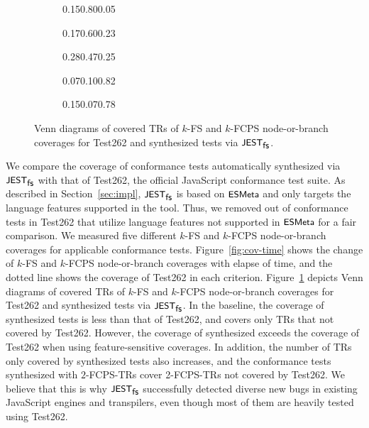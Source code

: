 \begin{figure}
  \centering
  \begin{subfigure}{0.19\textwidth}
    {0.15}{0.80}{0.05}
  \end{subfigure}
  \begin{subfigure}{0.19\textwidth}
    {0.17}{0.60}{0.23}
  \end{subfigure}
  \begin{subfigure}{0.19\textwidth}
    {0.28}{0.47}{0.25}
  \end{subfigure}
  \begin{subfigure}{0.19\textwidth}
    {0.07}{0.10}{0.82}
  \end{subfigure}
  \begin{subfigure}{0.19\textwidth}
    {0.15}{0.07}{0.78}
  \end{subfigure}
  \caption{
    Venn diagrams of covered TRs of $k$-FS and $k$-FCPS node-or-branch coverages
    for Test262 and synthesized tests via $\textsf{\small JEST}_{\textsf{\small fs}}$.
  }
  \label{fig:venn-test262}
\end{figure}



We compare the coverage of conformance tests automatically synthesized via
$\textsf{\small JEST}_{\textsf{\small fs}}$ with that of Test262, the official JavaScript conformance test suite.
%
As described in Section~\ref{sec:impl}, $\textsf{\small JEST}_{\textsf{\small fs}}$ is based on $\textsf{\small ESMeta}$ and only
targets the language features supported in the tool.
%
Thus, we removed  out of  conformance tests in
Test262 that utilize language features not supported in $\textsf{\small ESMeta}$ for a fair
comparison.
%
We measured five different $k$-FS and $k$-FCPS node-or-branch coverages for
 applicable conformance tests.
%
Figure~\ref{fig:cov-time} shows the change of $k$-FS and $k$-FCPS node-or-branch
coverages with elapse of time, and the dotted line shows the coverage of Test262
in each criterion.
%
Figure~\ref{fig:venn-test262} depicts Venn diagrams of covered TRs of $k$-FS and
$k$-FCPS node-or-branch coverages for Test262 and synthesized tests via $\textsf{\small JEST}_{\textsf{\small fs}}$.
%
In the baseline, the coverage of synthesized tests is less than that of Test262,
and covers only  TRs that not covered by Test262.
%
However, the coverage of synthesized exceeds the coverage of Test262 when using
feature-sensitive coverages.
%
In addition, the number of TRs only covered by synthesized tests also increases,
and the conformance tests synthesized with $2$-FCPS-TRs cover 
2-FCPS-TRs not covered by Test262.
%
We believe that this is why $\textsf{\small JEST}_{\textsf{\small fs}}$ successfully detected diverse new bugs in
existing JavaScript engines and transpilers, even though most of them are
heavily tested using Test262.
